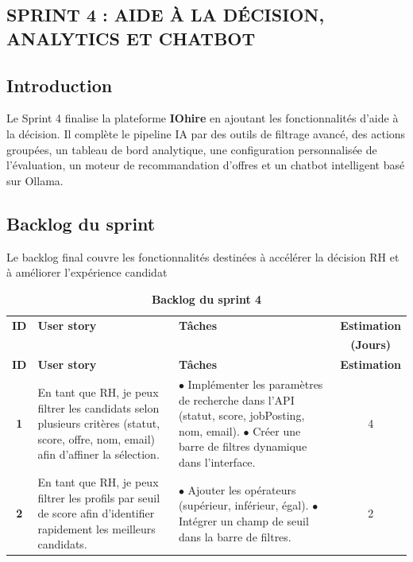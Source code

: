 \documentclass[12pt,a4paper,oneside]{report}
\begin{document}
\begin{itemize}
\chapter{SPRINT 4 : AIDE À LA DÉCISION, ANALYTICS ET CHATBOT}

\section*{Introduction}
Le Sprint 4 finalise la plateforme \textbf{IOhire} en ajoutant les fonctionnalités d'aide à la décision. Il complète le pipeline IA par des outils de filtrage avancé, des actions groupées, un tableau de bord analytique, une configuration personnalisée de l'évaluation, un moteur de recommandation d'offres et un chatbot intelligent basé sur Ollama.

\section{Backlog du sprint}
Le backlog final couvre les fonctionnalités destinées à accélérer la décision RH et à améliorer
l’expérience candidat
\small
\renewcommand{\arraystretch}{1.5}
\begin{xltabular}{\textwidth}{|c|>{\RaggedRight}p{4cm}|X|c|}
\caption{\textbf{Backlog du sprint 4}}
\hline
\textbf{ID} & \textbf{User story} & \textbf{Tâches} & \textbf{Estimation} \\
& & & \textbf{(Jours)} \\ \hline
\endfirsthead
\hline
\textbf{ID} & \textbf{User story} & \textbf{Tâches} & \textbf{Estimation} \\ \hline
\endhead
\hline
\endfoot
\hline
\endlastfoot

\textbf{1} & En tant que RH, je peux filtrer les candidats selon plusieurs critères (statut, score, offre, nom, email) afin d’affiner la sélection. & 
$\bullet$ Implémenter les paramètres de recherche dans l’API (statut, score, jobPosting, nom, email). \newline
$\bullet$ Créer une barre de filtres dynamique dans l’interface. & 4 \\ \hline

\textbf{2} & En tant que RH, je peux filtrer les profils par seuil de score afin d’identifier rapidement les meilleurs candidats. & 
$\bullet$ Ajouter les opérateurs (supérieur, inférieur, égal). \newline
$\bullet$ Intégrer un champ de seuil dans la barre de filtres. & 2 \\ \hline


\end{xltabular}
\end{itemize}
\end{document}
